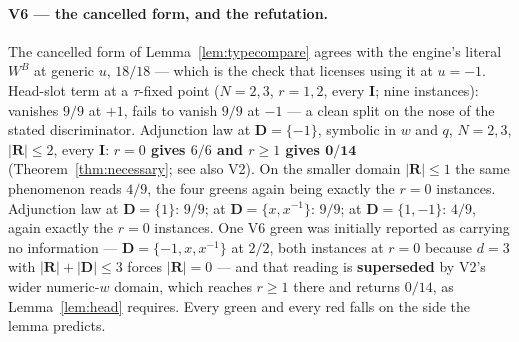 \documentclass[11pt]{article}
\theoremstyle{definition}
\newcommand{\bI}{\mathbf{I}}
\newcommand{\bD}{\mathbf{D}}
\newcommand{\bR}{\mathbf{R}}
\begin{document}
\paragraph{V6 --- the cancelled form, and the refutation.}  The cancelled form
of Lemma~\ref{lem:typecompare} agrees with the engine's literal $W^{B}$ at
generic $u$, $18/18$ --- which is the check that licenses using it at $u=-1$.
Head-slot term at a $\tau$-fixed point ($N=2,3$, $r=1,2$, every $\bI$;
nine instances): vanishes $9/9$ at $+1$, fails to vanish $9/9$ at $-1$ --- a
clean split on the nose of the stated discriminator.  Adjunction law at
$\bD=\{-1\}$, symbolic in $w$ and $q$, $N=2,3$, $|\bR|\le2$, every $\bI$:
\textbf{$r=0$ gives $6/6$ and $r\ge1$ gives $\mathbf{0/14}$}
(Theorem~\ref{thm:necessary}; see also V2).  On the smaller domain
$|\bR|\le1$ the same phenomenon reads $4/9$, the four greens again being
exactly the $r=0$ instances.  Adjunction law at $\bD=\{1\}$: $9/9$; at $\bD=\{x,x^{-1}\}$: $9/9$;
at $\bD=\{1,-1\}$: $4/9$, again exactly the $r=0$ instances.  One V6 green was
initially reported as carrying no information --- $\bD=\{-1,x,x^{-1}\}$ at
$2/2$, both instances at $r=0$ because $d=3$ with $|\bR|+|\bD|\le3$ forces
$|\bR|=0$ --- and that reading is \textbf{superseded} by V2's wider
numeric-$w$ domain, which reaches $r\ge1$ there and returns $0/14$, as
Lemma~\ref{lem:head} requires.  Every green and every red falls on the side the
lemma predicts.
\end{document}

